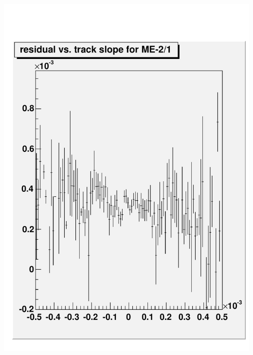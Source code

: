 \documentclass[compress]{beamer}
\begin{document}
\begin{frame}
\begin{columns}
\includegraphics[width=\linewidth]{residual_vsslope.pdf}
\end{columns}
\end{frame}
\end{document}
